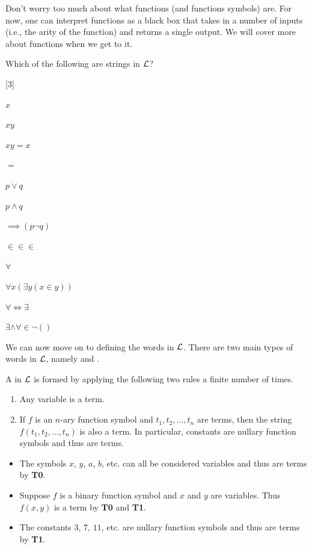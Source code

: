 Don't worry too much about what functions (and functions symbols) are. For now, one can interpret functions as a black box that takes in a number of inputs (i.e., the arity of the function) and returns a single output. We will cover more about functions when we get to it.

\begin{exercise}
    Which of the following are strings in $\mathcal{L}$?
    \begin{partquestions}{\alph*}[3]
        \item $x$
        \item $xy$
        \item $xy = x$
        \item $=$
        \item $p \lor q$
        \item $p \land q$
        \item $\implies (p \lnot q)$
        \item $\in \in \in$
        \item $\forall$
        \item $\forall x (\exists y (x \in y))$
        \item $\forall \iff \exists$
        \item $\exists \land \forall \in \lnot ()$
    \end{partquestions}
\end{exercise}

We can now move on to defining the words in $\mathcal{L}$. There are two main types of words in $\mathcal{L}$, namely  and .

\begin{definition}[Term]
    A  in $\mathcal{L}$ is formed by applying the following two rules a finite number of times.
    \begin{enumerate}[label=\textbf{T\arabic*.},start=0,leftmargin=1.35\parindent]
        \item Any variable is a term.
        \item If $f$ is an $n$-ary function symbol and $t_1, t_2, \dots, t_n$ are terms, then the string $f(t_1,t_2,\dots,t_n)$ is also a term. In particular, constants are nullary function symbols and thus are terms.
    \end{enumerate}
\end{definition}

\begin{example}
    \begin{itemize}[leftmargin=*]
        \item The symbols $x$, $y$, $a$, $b$, etc. can all be considered variables and thus are terms by \textbf{T0}.
        \item Suppose $f$ is a binary function symbol and $x$ and $y$ are variables. Thus $f(x,y)$ is a term by \textbf{T0} and \textbf{T1}.
        \item The constants $3$, $7$, $11$, etc. are nullary function symbols and thus are terms by \textbf{T1}.
    \end{itemize}
\end{example}

